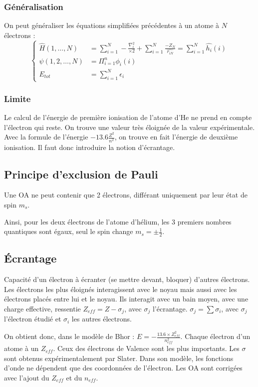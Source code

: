 \documentclass[french]{yLectureNote}
\newcommand{\HH}{\hat{H}}
\newcommand{\lap}{\nabla^2}
\begin{document}
\subsubsection{Généralisation}
On peut généraliser les équations simplifiées précédentes à un atome à \(N\) électrons :
\[ \left\{\begin{matrix}
  \HH(1,\dots, N) &= \sum_{i=1}^N -\frac{\lap_i}{×2}+\sum_{i=1}^N\frac{-Z_N}{\hat{r_{iN}}} = \sum_{i=1}^N\hat{h_i}(i)\\
  \psi(1,2,\dots, N) &= \Pi^n_{i=1}\phi_i(i)\\
  E_{tot} &= \sum_{i=1}^N\epsilon_i
\end{matrix}\right.\]
\subsubsection{Limite}
Le calcul de l'énergie de première ionisation de l'atome d'He ne prend en compte l'électron qui reste. On trouve une valeur très éloignée de la valeur expérimentale. Avec la formule de l'énergie \(-13.6\frac{Z^2}{n^2}\), on trouve en fait l'énergie de deuxième ionisation. Il faut donc introduire la notion d'écrantage.
\subsection{Principe d'exclusion de Pauli}
\begin{theorem}
 Une OA ne peut contenir que 2 électrons, différant uniquement par leur état de spin \(m_s\).
\end{theorem}
Ainsi, pour les deux électrons de l'atome d'hélium, les 3 premiers nombres quantiques sont égaux, seul le spin change \(m_s = \pm \frac12\).
\subsection{Écrantage}
\begin{theorem}[Écrantage]
Capacité d'un électron à écranter (se mettre devant, bloquer) d'autres électrons. Les électrons les plus éloignés interagissent avec le noyau mais aussi avec les électrons placés entre lui et le noyau. Ils interagit avec un bain moyen, avec une charge effective, ressentie $Z_{eff} = Z-\sigma_j$, avec $\sigma_j$ l'écrantage.
$\sigma_j = \sum \sigma_i$, avec $\sigma_j$ l'électron étudié et $\sigma_i$ les autres électrons.
\end{theorem}
On obtient donc, dans le modèle de Bhor : $E = -\frac{13.6\times Z_{eff}^2}{n_{eff}^2}$.
Chaque électron d'un atome à un $Z_{eff}$. Ceux des électrons de Valence sont les plus importants.
Les \(\sigma\) sont obtenus expérimentalement par Slater. Dans son modèle, les fonctions d'onde ne dépendent que des coordonnées de l'électron. Les OA sont corrigées avec l'ajout du \(Z_{eff}\) et du \(n_{eff}\).
\end{document}
